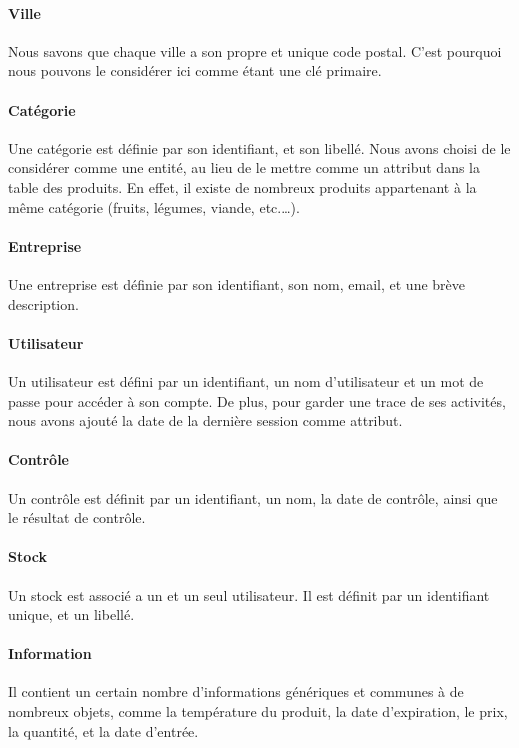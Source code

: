 \paragraph{Ville} Nous savons que chaque ville a son propre et unique code postal. C'est pourquoi nous pouvons le considérer ici comme étant une clé primaire.

\paragraph{Catégorie}
Une catégorie est définie par son identifiant, et son libellé. Nous avons choisi de le considérer comme une entité, au lieu de le mettre comme un attribut dans la table des produits. En effet, il existe de nombreux produits appartenant à la même catégorie (fruits, légumes, viande, etc.…).

\paragraph{Entreprise} Une entreprise est définie par son identifiant, son nom, email, et une brève description.

\paragraph{Utilisateur} Un utilisateur est défini par un identifiant, un nom d'utilisateur et un mot de passe pour accéder à son compte. De plus, pour garder une trace de ses activités, nous avons ajouté la date de la dernière session comme attribut.

\paragraph{Contrôle} Un contrôle est définit par un identifiant, un nom, la date de contrôle, ainsi que le résultat de contrôle.

\paragraph{Stock} Un stock est associé a un et un seul utilisateur. Il est définit par un identifiant unique, et un libellé.

\paragraph{Information} Il contient un certain nombre d'informations génériques et communes à de nombreux objets, comme la température du produit, la date d'expiration, le prix, la quantité, et la date d'entrée.

